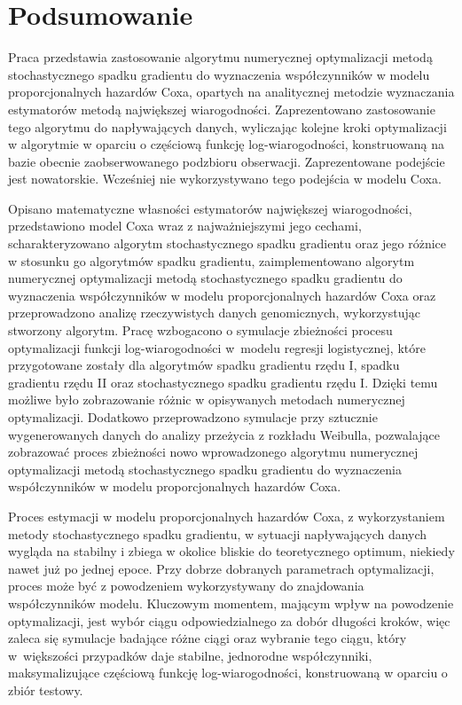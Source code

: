 \chapter*{Podsumowanie}
Praca przedstawia zastosowanie algorytmu numerycznej optymalizacji metodą stochastycznego spadku gradientu do wyznaczenia współczynników w modelu proporcjonalnych hazardów Coxa, opartych na analitycznej metodzie wyznaczania estymatorów metodą największej wiarogodności. Zaprezentowano zastosowanie tego algorytmu do napływających danych, wyliczając kolejne kroki optymalizacji w algorytmie w oparciu o częściową funkcję log-wiarogodności, konstruowaną na bazie obecnie zaobserwowanego podzbioru obserwacji. Zaprezentowane podejście jest nowatorskie. Wcześniej nie wykorzystywano tego podejścia w modelu Coxa.

Opisano matematyczne własności estymatorów największej wiarogodności, przedstawiono model Coxa wraz z najważniejszymi jego cechami, scharakteryzowano algorytm stochastycznego spadku gradientu oraz jego różnice w stosunku go algorytmów spadku gradientu, zaimplementowano algorytm numerycznej optymalizacji metodą stochastycznego spadku gradientu do wyznaczenia współczynników w modelu proporcjonalnych hazardów Coxa oraz przeprowadzono analizę rzeczywistych danych genomicznych, wykorzystując stworzony algorytm. Pracę wzbogacono o symulacje zbieżności procesu optymalizacji funkcji log-wiarogodności w~modelu regresji logistycznej, które przygotowane zostały dla algorytmów spadku gradientu rzędu I, spadku gradientu rzędu II oraz stochastycznego spadku gradientu rzędu I. Dzięki temu możliwe było zobrazowanie różnic w opisywanych metodach numerycznej optymalizacji. Dodatkowo przeprowadzono symulacje przy sztucznie wygenerowanych danych do analizy przeżycia z rozkładu Weibulla, pozwalające zobrazować proces zbieżności nowo wprowadzonego algorytmu numerycznej optymalizacji metodą stochastycznego spadku gradientu do wyznaczenia współczynników w modelu proporcjonalnych  hazardów Coxa.

Proces estymacji w modelu proporcjonalnych hazardów Coxa, z wykorzystaniem metody stochastycznego spadku gradientu, w sytuacji napływających danych wygląda na stabilny i zbiega w okolice bliskie do teoretycznego optimum, niekiedy nawet już po jednej epoce. Przy dobrze dobranych parametrach optymalizacji, proces może być z powodzeniem wykorzystywany do znajdowania współczynników modelu. Kluczowym momentem, mającym wpływ na powodzenie optymalizacji, jest wybór ciągu odpowiedzialnego za dobór długości kroków, więc zaleca się symulacje badające różne ciągi oraz wybranie tego ciągu, który w~większości przypadków daje stabilne, jednorodne współczynniki, maksymalizujące częściową funkcję log-wiarogodności, konstruowaną w oparciu o zbiór testowy. 

